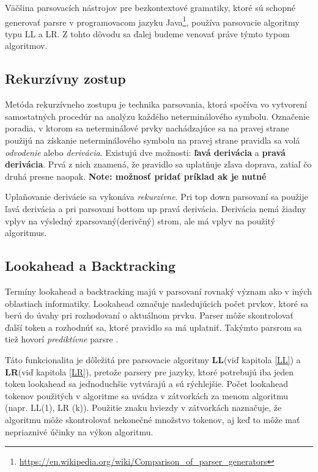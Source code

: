 Väčšina parsovacích nástrojov pre bezkontextové gramatiky, ktoré sú schopné generovať parsre v programovacom jazyku Java\footnote{\url{https://en.wikipedia.org/wiki/Comparison_of_parser_generators}}, používa parsovacie algoritmy typu LL a LR. Z tohto dôvodu sa ďalej budeme venovať práve týmto typom algoritmov.

\subsection{Rekurzívny zostup}\label{recursive-descent}
Metóda rekurzívneho zostupu je technika parsovania, ktorá spočíva vo vytvorení samostatných procedúr na analýzu každého neterminálového symbolu. \cite{CVUT:program_language} Označenie poradia, v ktorom sa neterminálové prvky nachádzajúce sa na pravej strane použijú na získanie neterminálového symbolu na pravej strane pravidla sa volá \textit{odvodenie} alebo \textit{derivácia}. Existujú dve možnosti: \textbf{ľavá derivácia} a \textbf{pravá derivácia}. Prvá z nich znamená, že pravidlo sa uplatňuje zľava doprava, zatiaľ čo druhá presne naopak. 
\textbf{Note: možnosť pridať príklad ak je nutné}

Uplaňovanie derivácie sa vykonáva \textit{rekurzívne}. Pri top down parsovaní sa použije ľavá derivácia a pri parsovani bottom up pravá derivácia. Derivácia nemá žiadny vplyv na výsledný zparsovaný(derivčný) strom, ale má vplyv na použitý algoritmus.

\subsection{Lookahead a Backtracking}
Termíny lookahead a backtracking majú v parsovaní rovnaký význam ako v iných oblastiach informatiky. Lookahead označuje nasledujúcich počet prvkov, ktoré sa berú do úvahy pri rozhodovaní o aktuálnom prvku. Parser môže skontrolovať ďalší token a rozhodnúť sa, ktoré pravidlo sa má uplatniť. Takýmto parsrom sa tiež hovorí \textit{prediktívne} parsre \cite{haberman:parsing_demystified}.

Táto funkcionalita je dôležitá pre parsovacie algoritmy \textbf{LL}(viď kapitola \ref{LL}) a \textbf{LR}(viď kapitola \ref{LR}), pretože parsery pre jazyky, ktoré potrebujú iba jeden token lookahead sa jednoduchšie vytvárajú a sú rýchlejšie. Počet lookahead tokenov použitých v algoritme sa uvádza v zátvorkách za menom algoritmu (napr. LL(1), LR (k)). Použitie znaku hviezdy v zátvorkách naznačuje, že algoritmu môže skontrolovať nekonečné množstvo tokenov, aj keď to môže mať nepriaznivé účinky na výkon algoritmu.\cite{tomassetti:parsing}

